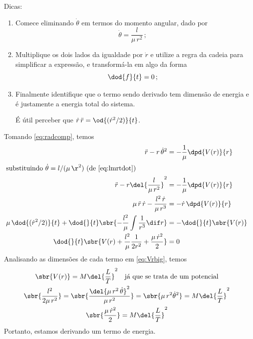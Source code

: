 \documentclass[]{IMTexam}
\begin{document}
\begin{questions}
\begin{parts}
		Dicas:
		\begin{enumerate}
			\item Comece eliminando $ \dot{\theta} $ em termos do momento angular, dado por
			      \begin{equation}\label{eq:eq7}
				      \dot{\theta}=\dfrac{l}{\mu\,r^{2}}\,;
			      \end{equation}

			\item Multiplique os dois lados da igualdade por $ \dot{r} $ e utilize a regra da cadeia para simplificar a expressão, e transformá-la em algo da forma
			      \begin{equation}\label{eq:eq8}
				      \dod{f}{t}=0\,;
			      \end{equation}

			\item Finalmente identifique que o termo sendo derivado tem dimensão de energia e é justamente a energia total do sistema.

			      É útil perceber que $ \dot{r}\,\ddot{r}=\od{(\dot{r}^{2}/2)}{t} $.

		\end{enumerate}

		\begin{solution}
			Tomando \ref{eq:radcomp}, temos
			\begin{align}
				\ddot{r}-r\,\dot{\theta}^{2}                                                                & =-\dfrac{1}{\mu}\dpd{V(r)}{r} \\
				\intertext{substituindo $ \dot{\theta}=l/(\mu\,\r^{2}) $ (de \ref{eq:lmrtdot})}
				\ddot{r}-r\del{\dfrac{l}{\mu\,r^{2}}}^{2}                                                   & =-\dfrac{1}{\mu}\dpd{V(r)}{r} \\
				\mu\,\ddot{r}\,\dot{r}-\dfrac{l^{2}\,\dot{r}}{\mu\,r^{3}}                                   & =-\dot{r}\,\dpd{V(r)}{r}      \\
				\mu\,\dod{(\dot{r}^{2}/2)}{t}+\dod{}{t}\sbr{-\dfrac{l^{2}}{\mu}\int \dfrac{1}{r^{3}}\dif r} & =-\dod{}{t}\sbr{V(r)}         \\
				\dod{}{t}\sbr{V(r)+\dfrac{l^{2}}{\mu}\dfrac{1}{2r^{2}}+\dfrac{\mu\,\dot{r}^{2}}{2}}         & =0\label{eq:Vrbig}
			\end{align}
			Analisando as dimensões de cada termo em \ref{eq:Vrbig}, temos
			\begin{gather*}
				\sbr{V(r)}=M\del{\dfrac{L}{T}}^{2}\quad\text{já que se trata de um potencial}\\
				\sbr{\dfrac{l^{2}}{2\mu\,r^{2}}}=\sbr{\dfrac{\del{\mu\,r^{2}\,\dot{\theta}}^{2}}{\mu\,r^{2}}}=\sbr{\mu\,r^{2}\dot{\theta}^{2}}=M\del{\dfrac{L}{T}}^{2}\\
				\sbr{\dfrac{\mu\,\dot{r}^{2}}{2}}=M\del{\dfrac{L}{T}}^{2}
			\end{gather*}
			Portanto, estamos derivando um termo de energia.
		\end{solution}


\end{parts}
\end{questions}
\end{document}
